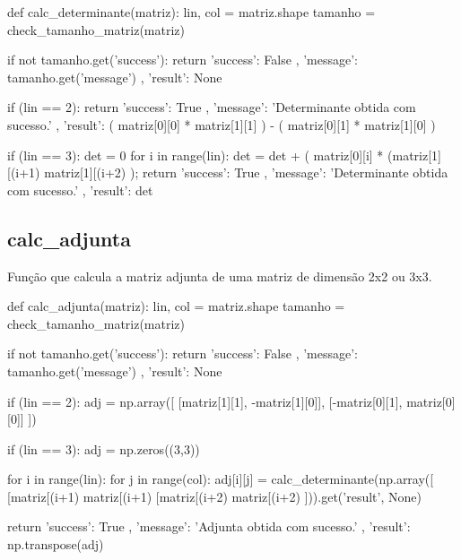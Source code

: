 \documentclass[a4paper, 11pt]{article}
\begin{document}
\begin{python}[language=Python]
def calc_determinante(matriz):
    lin, col = matriz.shape
    tamanho = check_tamanho_matriz(matriz)
    
    if not tamanho.get('success'):
        return {
            'success': False
            , 'message': tamanho.get('message')
            , 'result': None
        }
    
    if (lin == 2):
        return {
            'success': True
            , 'message': 'Determinante obtida com sucesso.'
            , 'result': ( matriz[0][0] * matriz[1][1] ) - 
                        ( matriz[0][1] * matriz[1][0] )
        }
    
    if (lin == 3):
        det = 0
        for i in range(lin):
            det = det + (
                matriz[0][i] * 
                (matriz[1][(i+1)%
                 matriz[1][(i+2)%
            );
        return {
            'success': True
            , 'message': 'Determinante obtida com sucesso.'
            , 'result': det
        }
\end{python}

\newpage
\subsection*{calc\_adjunta}
Função que calcula a matriz adjunta de uma matriz de dimensão 2x2 ou 3x3.

\begin{python}[language=Python]
def calc_adjunta(matriz):
    lin, col = matriz.shape
    tamanho = check_tamanho_matriz(matriz)
    
    if not tamanho.get('success'):
        return {
            'success': False
            , 'message': tamanho.get('message')
            , 'result': None
        }
    
    if (lin == 2):
        adj = np.array([
                [matriz[1][1], -matriz[1][0]],
                [-matriz[0][1], matriz[0][0]]
            ])
    
    if (lin == 3):
        adj = np.zeros((3,3))
        
        for i in range(lin):
            for j in range(col):
                adj[i][j] = calc_determinante(np.array([
                    [matriz[(i+1)%
                        matriz[(i+1)%
                    [matriz[(i+2)%
                        matriz[(i+2)%
                ])).get('result', None) 
    
    return {
            'success': True
            , 'message': 'Adjunta obtida com sucesso.'
            , 'result': np.transpose(adj)
        }
\end{python}
\end{document}
